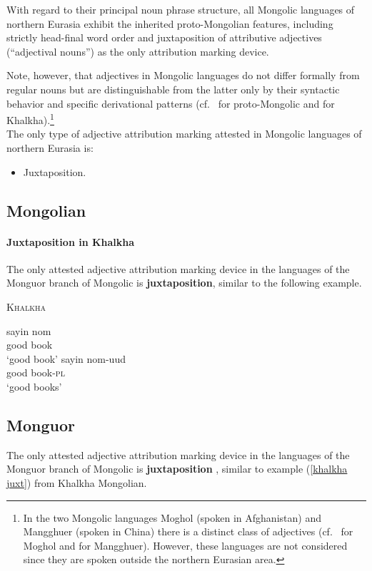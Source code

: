 \noindent With regard to their principal noun phrase structure, all Mongolic languages of northern Eurasia exhibit the inherited proto-Mongolian features, including strictly head-final word order and juxtaposition of attributive adjectives (“adjecti\-val nouns”) as the only attribution marking device.

Note, however, that adjectives in Mongolic languages do not differ formally from regular nouns but are distinguishable from the latter only by their syntactic behavior and specific derivational patterns (cf.~\citealt[10]{janhunen2003b} for proto-Mongolic and \citealt[161]{svantesson2003} for Khalkha).\footnote{In the two Mongolic languages Moghol (spoken in Afghanistan) and Mangghuer (spoken in China) there is a distinct class of adjectives (cf.~\citealt[252]{weiers2003} for Moghol and \citealt[311]{slater2003} for Mangghuer). However, these languages are not considered since they are spoken outside the northern Eurasian area.}\\

\noindent The only type of adjective attribution marking attested in Mongolic languages of northern Eurasia is:
\begin{itemize}
\item Juxtaposition.
\end{itemize}

\subsection{Mongolian}
\paragraph{Juxtaposition in Khalkha}
The only attested adjective attribution marking device in the languages of the Monguor branch of Mongolic is \textbf{juxtaposition}, similar to the following example. 
\begin{exe}
\ex \textsc{Khalkha} \citep{svantesson2003} \label{khalkha juxt}
\begin{xlist}
\ex
\gll	sayin nom\\
	good book\\
\glt	‘good book’
\ex 
\gll	sayin nom-uud\\
	good book-\textsc{pl}\\
\glt ‘good books’
\end{xlist}
\end{exe}

\subsection{Monguor}
The only attested adjective attribution marking device in the languages of the Monguor branch of Mongolic is \textbf{juxtaposition} \citep{slater2003}, similar to example (\ref{khalkha juxt}) from Khalkha Mongolian.

